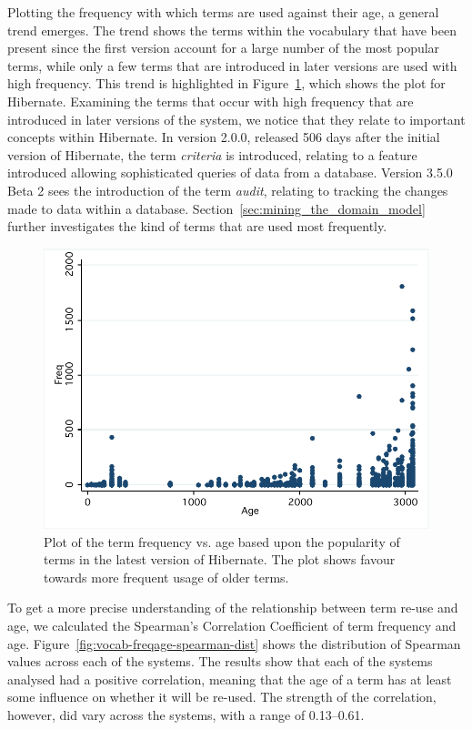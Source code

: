 Plotting the frequency with which terms are used against their age, a general trend emerges. The trend shows the terms within the vocabulary that have been present since the first version account for a large number of the most popular terms, while only a few terms that are introduced in later versions are used with high frequency. This trend is highlighted in Figure~\ref{fig:vocab-freqage-hibernate}, which shows the plot for Hibernate. Examining the terms that occur with high frequency that are introduced in later versions of the system, we notice that they relate to important concepts within Hibernate. In version 2.0.0, released 506 days after the initial version of Hibernate, the term \emph{criteria} is introduced, relating to a feature introduced allowing sophisticated queries of data from a database. Version 3.5.0 Beta 2 sees the introduction of the term \emph{audit}, relating to tracking the changes made to data within a database. Section~\ref{sec:mining_the_domain_model} further investigates the kind of terms that are used most frequently.

\begin{figure}[t]
\centering
\includegraphics[width=\textwidth]{Figures/Vocab-HibernateFrequencyAge.pdf}
\caption{Plot of the term frequency vs. age based upon the popularity of terms in the latest version of Hibernate. The plot shows favour towards more frequent usage of older terms.}
\label{fig:vocab-freqage-hibernate}
\end{figure}

To get a more precise understanding of the relationship between term re-use and age, we calculated the Spearman's Correlation Coefficient of term frequency and age. Figure~\ref{fig:vocab-freqage-spearman-dist} shows the distribution of Spearman values across each of the systems. The results show that each of the systems analysed had a positive correlation, meaning that the age of a term has at least some influence on whether it will be re-used. The strength of the correlation, however, did vary across the systems, with a range of 0.13--0.61.

